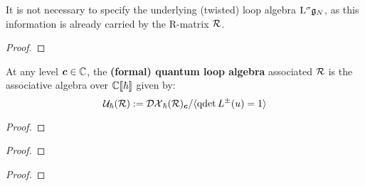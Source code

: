         \begin{remark}
            It is not necessary to specify the underlying (twisted) loop algebra $\mathrm{L}^{\sigma} \mathfrak{g}_N$, as this information is already carried by the R-matrix $\mathcal{R}$.
        \end{remark}

        \begin{lemma} \label{lemma: centres_of_extended_loop_QUEs}
        \end{lemma}
            \begin{proof}
                
            \end{proof}
        \begin{definition} \label{def: loop_QUEs_R_matrix_presentation}
            At any level $\boldsymbol{c} \in \mathbb{C}$, the \textbf{(formal) quantum loop algebra} associated $\mathcal{R}$ is the associative algebra over $\mathbb{C}[\![\hbar]\!]$ given by:
                $$\mathcal{U}_{\hbar}(\mathcal{R}) := \mathcal{DX}_{\hbar}(\mathcal{R})_{\boldsymbol{c}}/\langle\operatorname{qdet} L^{\pm}(u) = 1\rangle$$
        \end{definition}

        \begin{proposition} \label{prop: PBW_for_loop_QUEs}
            
        \end{proposition}
            \begin{proof}
                
            \end{proof}

        \begin{lemma} \label{lemma: hopf_structure_on_extended_loop_QUEs}
            
        \end{lemma}
            \begin{proof}
                
            \end{proof}
        \begin{corollary} \label{coro: hopf_structure_on_loop_QUEs}
            
        \end{corollary}
            \begin{proof}
                
            \end{proof}

